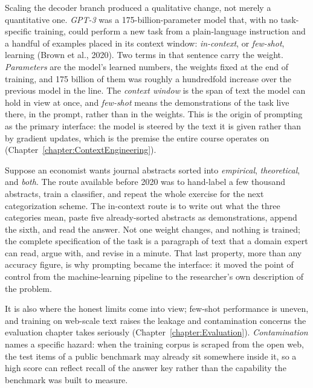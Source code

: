 Scaling the decoder branch produced a qualitative change, not merely a quantitative one.
\emph{GPT-3} was a 175-billion-parameter model that, with no task-specific training, could perform a new task from a plain-language instruction and a handful of examples placed in its context window: \emph{in-context}, or \emph{few-shot}, learning (Brown et al., 2020).
Two terms in that sentence carry the weight.
\emph{Parameters} are the model's learned numbers, the weights fixed at the end of training, and 175 billion of them was roughly a hundredfold increase over the previous model in the line.
The \emph{context window} is the span of text the model can hold in view at once, and \emph{few-shot} means the demonstrations of the task live there, in the prompt, rather than in the weights.
This is the origin of prompting as the primary interface: the model is steered by the text it is given rather than by gradient updates, which is the premise the entire course operates on (Chapter~\ref{chapter:ContextEngineering}).

\begin{example}
Suppose an economist wants journal abstracts sorted into \emph{empirical}, \emph{theoretical}, and \emph{both}.
The route available before 2020 was to hand-label a few thousand abstracts, train a classifier, and repeat the whole exercise for the next categorization scheme.
The in-context route is to write out what the three categories mean, paste five already-sorted abstracts as demonstrations, append the sixth, and read the answer.
Not one weight changes, and nothing is trained; the complete specification of the task is a paragraph of text that a domain expert can read, argue with, and revise in a minute.
That last property, more than any accuracy figure, is why prompting became the interface: it moved the point of control from the machine-learning pipeline to the researcher's own description of the problem.
\end{example}

It is also where the honest limits come into view; few-shot performance is uneven, and training on web-scale text raises the leakage and contamination concerns the evaluation chapter takes seriously (Chapter~\ref{chapter:Evaluation}).
\emph{Contamination} names a specific hazard: when the training corpus is scraped from the open web, the test items of a public benchmark may already sit somewhere inside it, so a high score can reflect recall of the answer key rather than the capability the benchmark was built to measure.

